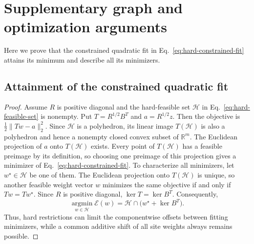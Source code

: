 \section{Supplementary graph and optimization arguments}
\label{app:graph-optimization}

Here we prove that the constrained quadratic fit in Eq.~\eqref{eq:hard-constrained-fit} attains its minimum and describe all its minimizers.


\subsection{Attainment of the constrained quadratic fit}
\label{app:constrained-attainment}

\begin{proof}
Assume $R$ is positive diagonal and the hard-feasible set $\mathcal H$
in Eq.~\eqref{eq:hard-feasible-set} is nonempty. Put
$T=R^{1/2}B^T$ and $a=R^{1/2}z$. Then the objective is
$\frac12\|Tw-a\|_2^2$. Since $\mathcal H$ is a polyhedron,
its linear image $T(\mathcal H)$ is also a polyhedron
\citep[Theorem~19.3]{Rockafellar1970} and hence
a nonempty closed convex subset of $\mathbb R^m$.
The Euclidean projection of $a$ onto $T(\mathcal H)$ exists.
Every point of $T(\mathcal H)$ has a feasible preimage by its
definition, so choosing one preimage of this projection gives
a minimizer of Eq.~\eqref{eq:hard-constrained-fit}.
To characterize all minimizers, let $w^\star\in\mathcal H$ be one
of them. The Euclidean projection onto $T(\mathcal H)$ is unique,
so another feasible weight vector $w$ minimizes the same objective
if and only if $Tw=Tw^\star$. Since $R$ is positive diagonal,
$\ker T=\ker B^T$. Consequently,
\begin{equation}
\operatorname*{argmin}_{w\in\mathcal H}\mathcal E(w)
=\mathcal H\cap\bigl(w^\star+\ker B^T\bigr).
\label{eq:constrained-minimizer-set}
\end{equation}
Thus, hard restrictions can limit the componentwise offsets
between fitting minimizers, while a common additive shift of all
site weights always remains possible.
\end{proof}
